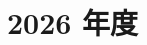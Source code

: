 \documentclass[../../hsm_tok_a.tex]{subfiles}
\begin{document}
    \section{2026 年度}

    

    \clearpage

    
\end{document}
